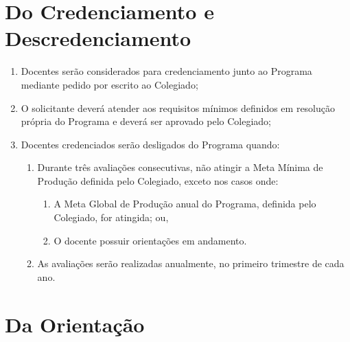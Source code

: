 \documentclass{article}
\begin{document}
\section{Do Credenciamento e Descredenciamento}
\begin{enumerate}
	\item Docentes serão considerados para credenciamento junto ao Programa mediante pedido por escrito ao Colegiado;

	\item O solicitante deverá atender aos requisitos mínimos definidos em resolução própria do Programa e deverá ser aprovado pelo Colegiado;

	\item Docentes credenciados serão desligados do Programa quando:
	\begin{enumerate}
		\item Durante três avaliações consecutivas, não atingir a Meta Mínima de Produção definida pelo Colegiado, exceto nos casos onde:
		\begin{enumerate}
			\item A Meta Global de Produção anual do Programa, definida pelo Colegiado, for atingida; ou,
			\item O docente possuir orientações em andamento.
		\end{enumerate}

		\item As avaliações serão realizadas anualmente, no primeiro trimestre de cada ano.
	\end{enumerate}

\end{enumerate}


\section{Da Orientação}
\end{document}
